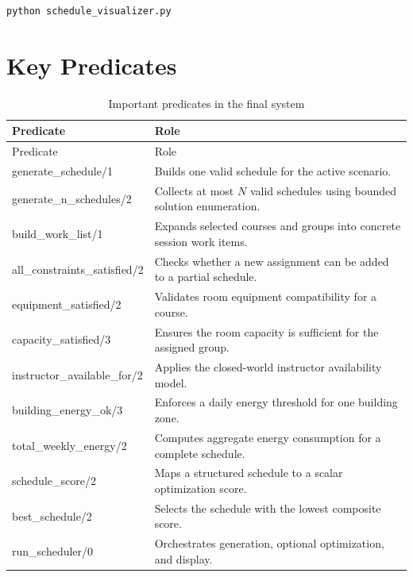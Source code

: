 \documentclass[12pt,a4paper]{article}
\begin{document}
\begin{lstlisting}[language=PlainText,caption={Launch the graphical visualization tool}]
python schedule_visualizer.py
\end{lstlisting}

\section{Key Predicates}

\begin{longtable}{>{\ttfamily}p{}p{}}
    \caption{Important predicates in the final system} \\
    \toprule
    Predicate & Role \\
    \midrule
    \endfirsthead
    \toprule
    Predicate & Role \\
    \midrule
    \endhead
    generate\_schedule/1 & Builds one valid schedule for the active scenario. \\
    generate\_n\_schedules/2 & Collects at most \(N\) valid schedules using bounded solution enumeration. \\
    build\_work\_list/1 & Expands selected courses and groups into concrete session work items. \\
    all\_constraints\_satisfied/2 & Checks whether a new assignment can be added to a partial schedule. \\
    equipment\_satisfied/2 & Validates room equipment compatibility for a course. \\
    capacity\_satisfied/3 & Ensures the room capacity is sufficient for the assigned group. \\
    instructor\_available\_for/2 & Applies the closed-world instructor availability model. \\
    building\_energy\_ok/3 & Enforces a daily energy threshold for one building zone. \\
    total\_weekly\_energy/2 & Computes aggregate energy consumption for a complete schedule. \\
    schedule\_score/2 & Maps a structured schedule to a scalar optimization score. \\
    best\_schedule/2 & Selects the schedule with the lowest composite score. \\
    run\_scheduler/0 & Orchestrates generation, optional optimization, and display. \\
    \bottomrule
\end{longtable}
\end{document}
